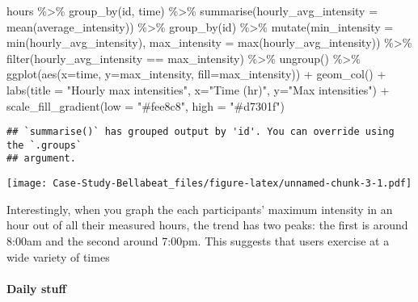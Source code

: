 \documentclass[
]{article}
\newenvironment{Shaded}{\begin{snugshade}}{\end{snugshade}}
\newcommand{\AttributeTok}[1]{\textcolor[rgb]{0.77,0.63,0.00}{#1}}
\newcommand{\FunctionTok}[1]{\textcolor[rgb]{0.00,0.00,0.00}{#1}}
\newcommand{\NormalTok}[1]{#1}
\newcommand{\SpecialCharTok}[1]{\textcolor[rgb]{0.00,0.00,0.00}{#1}}
\newcommand{\StringTok}[1]{\textcolor[rgb]{0.31,0.60,0.02}{#1}}
\begin{document}
\begin{Shaded}
\begin{Highlighting}[]
\NormalTok{hours }\SpecialCharTok{\%\textgreater{}\%}
  \FunctionTok{group\_by}\NormalTok{(id, time) }\SpecialCharTok{\%\textgreater{}\%}
  \FunctionTok{summarise}\NormalTok{(}\AttributeTok{hourly\_avg\_intensity =} \FunctionTok{mean}\NormalTok{(average\_intensity))  }\SpecialCharTok{\%\textgreater{}\%}
  \FunctionTok{group\_by}\NormalTok{(id) }\SpecialCharTok{\%\textgreater{}\%}
  \FunctionTok{mutate}\NormalTok{(}\AttributeTok{min\_intensity =} \FunctionTok{min}\NormalTok{(hourly\_avg\_intensity),}
            \AttributeTok{max\_intensity =} \FunctionTok{max}\NormalTok{(hourly\_avg\_intensity)) }\SpecialCharTok{\%\textgreater{}\%}
  \FunctionTok{filter}\NormalTok{(hourly\_avg\_intensity }\SpecialCharTok{==}\NormalTok{ max\_intensity) }\SpecialCharTok{\%\textgreater{}\%}
  \FunctionTok{ungroup}\NormalTok{() }\SpecialCharTok{\%\textgreater{}\%}
  \FunctionTok{ggplot}\NormalTok{(}\FunctionTok{aes}\NormalTok{(}\AttributeTok{x=}\NormalTok{time, }\AttributeTok{y=}\NormalTok{max\_intensity, }\AttributeTok{fill=}\NormalTok{max\_intensity)) }\SpecialCharTok{+} 
  \FunctionTok{geom\_col}\NormalTok{() }\SpecialCharTok{+} 
  \FunctionTok{labs}\NormalTok{(}\AttributeTok{title =} \StringTok{"Hourly max intensities"}\NormalTok{, }\AttributeTok{x=}\StringTok{"Time (hr)"}\NormalTok{, }\AttributeTok{y=}\StringTok{"Max intensities"}\NormalTok{) }\SpecialCharTok{+} 
  \FunctionTok{scale\_fill\_gradient}\NormalTok{(}\AttributeTok{low =} \StringTok{"\#fee8c8"}\NormalTok{, }\AttributeTok{high =} \StringTok{"\#d7301f"}\NormalTok{) }
\end{Highlighting}
\end{Shaded}

\begin{verbatim}
## `summarise()` has grouped output by 'id'. You can override using the `.groups`
## argument.
\end{verbatim}

\texttt{[image: Case-Study-Bellabeat\_files/figure-latex/unnamed-chunk-3-1.pdf]}

Interestingly, when you graph the each participants' maximum intensity
in an hour out of all their measured hours, the trend has two peaks: the
first is around 8:00am and the second around 7:00pm. This suggests that
users exercise at a wide variety of times

\hypertarget{daily-stuff}{%
\paragraph{Daily stuff}\label{daily-stuff}}
\end{document}
